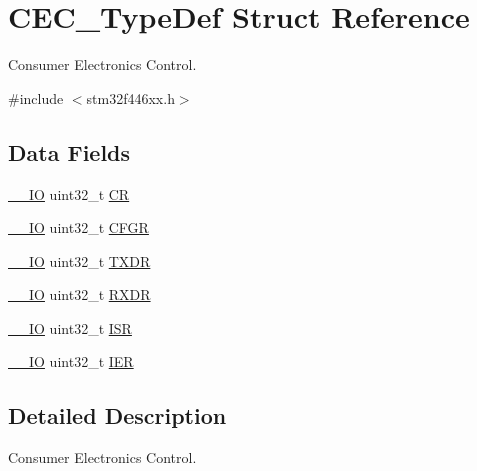 \hypertarget{struct_c_e_c___type_def}{}\section{C\+E\+C\+\_\+\+Type\+Def Struct Reference}
\label{struct_c_e_c___type_def}


Consumer Electronics Control.  




{\ttfamily \#include $<$stm32f446xx.\+h$>$}

\subsection*{Data Fields}
\begin{DoxyCompactItemize}
\item 
\mbox{\hyperlink{core__sc300_8h_aec43007d9998a0a0e01faede4133d6be}{\+\_\+\+\_\+\+IO}} uint32\+\_\+t \mbox{\hyperlink{struct_c_e_c___type_def_ab40c89c59391aaa9d9a8ec011dd0907a}{CR}}
\item 
\mbox{\hyperlink{core__sc300_8h_aec43007d9998a0a0e01faede4133d6be}{\+\_\+\+\_\+\+IO}} uint32\+\_\+t \mbox{\hyperlink{struct_c_e_c___type_def_a26f1e746ccbf9c9f67e7c60e61085ec1}{C\+F\+GR}}
\item 
\mbox{\hyperlink{core__sc300_8h_aec43007d9998a0a0e01faede4133d6be}{\+\_\+\+\_\+\+IO}} uint32\+\_\+t \mbox{\hyperlink{struct_c_e_c___type_def_ad7e8d785fff2acfeb8814e43bda8dd72}{T\+X\+DR}}
\item 
\mbox{\hyperlink{core__sc300_8h_aec43007d9998a0a0e01faede4133d6be}{\+\_\+\+\_\+\+IO}} uint32\+\_\+t \mbox{\hyperlink{struct_c_e_c___type_def_a9bf29a9104cb5569823ab892174f9c8c}{R\+X\+DR}}
\item 
\mbox{\hyperlink{core__sc300_8h_aec43007d9998a0a0e01faede4133d6be}{\+\_\+\+\_\+\+IO}} uint32\+\_\+t \mbox{\hyperlink{struct_c_e_c___type_def_ab3c49a96815fcbee63d95e1e74f20e75}{I\+SR}}
\item 
\mbox{\hyperlink{core__sc300_8h_aec43007d9998a0a0e01faede4133d6be}{\+\_\+\+\_\+\+IO}} uint32\+\_\+t \mbox{\hyperlink{struct_c_e_c___type_def_a6566f8cfbd1d8aa7e8db046aa35e77db}{I\+ER}}
\end{DoxyCompactItemize}


\subsection{Detailed Description}
Consumer Electronics Control. 

